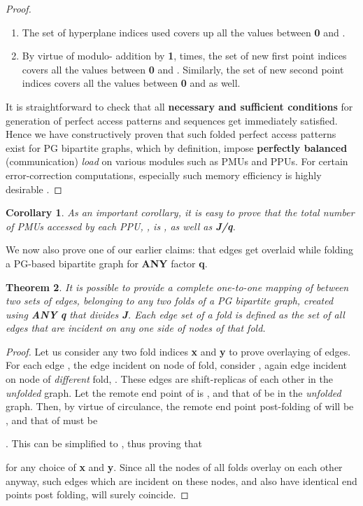\documentclass[12pt]{article}
\newtheorem{thm}{Theorem}
\newtheorem{corl}[thm]{Corollary}
\begin{document}
\begin{proof}
\begin{enumerate}
\item The set of hyperplane indices used covers up all the values between \textbf{0} and
.
\item By virtue of modulo- addition by \textbf{1},
 times, the set
of new first point indices covers all the values between \textbf{0} and
. Similarly, the set of new second point indices covers all the
values between \textbf{0} and  as well.
\end{enumerate}
It is straightforward to check that all \textbf{necessary and sufficient
conditions} for generation of perfect access patterns and sequences
\cite{karm1} get immediately satisfied. Hence we have constructively proven
that such folded perfect access patterns exist for PG bipartite graphs, which by
definition, impose \textbf{perfectly balanced} (communication)
\textit{load} on various modules such as PMUs and PPUs. For certain error-correction computations, especially
such memory efficiency is highly desirable \cite{tarable}.
\end{proof}
\begin{corl}
\label{corl1}
As an important corollary, it is easy to prove that the total number of
PMUs accessed by each PPU, , is 
, as well as  \textbf{J/q}.
\end{corl}

We now also prove one of our earlier claims: that edges get overlaid while
folding a PG-based bipartite graph for \textbf{ANY} factor \textbf{q}.

\begin{thm}
\label{th2}
It is possible to provide a complete one-to-one mapping of between two sets
of edges, belonging to any two folds of a PG bipartite graph, created using \textbf{ANY}
\textbf{q} that divides \textbf{J}. Each edge set of a fold is defined as
the set of all edges that are incident on \textit{any one side}
of nodes of that fold.
\end{thm}

\begin{proof}
Let us consider any two fold indices \textbf{x} and \textbf{y} to prove
overlaying of edges. For each edge , the  edge
incident on  node of  fold, consider
, again  edge incident on  node
of \textit{different} fold, . These edges are shift-replicas of
each other in the \textit{unfolded} graph. Let the remote end point of
 is , and that of  be  in the
\textit{unfolded} graph. Then, by virtue of circulance, the remote end
point post-folding of  will be
, and
that of  must be
 
. This can be simplified to
, thus
proving that
 
 for any
choice of \textbf{x} and \textbf{y}. Since all the  nodes
of all folds overlay on each other anyway, such edges which are incident on
these nodes, and also have identical end points post folding, will surely
coincide.
\end{proof}
\end{document}

